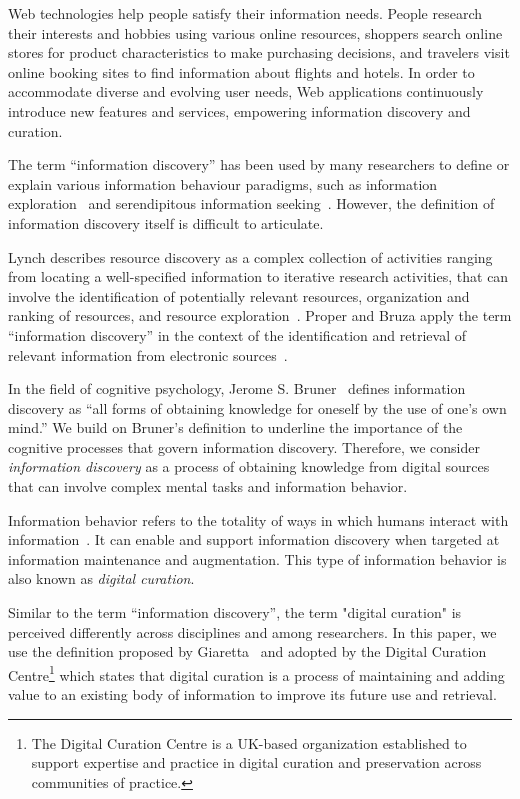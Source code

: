 \documentclass{sigchi}
\begin{document}
Web technologies help people satisfy their information needs. People research their interests and hobbies using various online resources, shoppers search online stores for product characteristics to make purchasing decisions, and travelers visit online booking sites to find information about flights and hotels. In order to accommodate diverse and evolving user needs, Web applications continuously introduce new features and services, empowering information discovery and curation. 

The term ``information discovery'' has been used by many researchers to define or explain various information behaviour paradigms, such as information exploration~\cite{waterworth1991model} and serendipitous information seeking~\cite{foster2003serendipity}. However, the definition of information discovery itself is difficult to articulate. 

Lynch describes resource discovery as a complex collection of activities ranging from locating a well-specified information to iterative research activities, that can involve the identification
of potentially relevant resources, organization and ranking of resources, and resource exploration~\cite{lynch1995networked}. Proper and Bruza apply the term ``information discovery'' in the context of  the identification and retrieval of relevant information from electronic sources~\cite{proper1999information}. 

In the field of cognitive psychology, Jerome S. Bruner~\cite{bruner1961act} defines information discovery as ``all forms of obtaining knowledge for oneself by the use of one's own mind.'' We build on Bruner's definition to underline the importance of the cognitive processes that govern information discovery. Therefore, we consider \textit{information discovery} as a process of obtaining knowledge from digital sources that can involve complex mental tasks and information behavior.  

Information behavior refers to the totality of ways in which humans interact with information~\cite{wilson2000human}. It can enable and support information discovery when targeted at information maintenance and augmentation. This type of information behavior is also known as \textit{digital curation}.

Similar to the term ``information discovery'', the term "digital curation" is perceived differently across disciplines and among researchers. In this paper, we use the definition proposed by Giaretta~\cite{giaretta2006dcc} and adopted by the Digital Curation Centre\footnote{The Digital Curation Centre is a UK-based organization established to support expertise and practice in digital curation and preservation across communities of practice.} which states that digital curation is a process of maintaining and adding value to an existing body of information to improve its future use and retrieval.   
\end{document}
